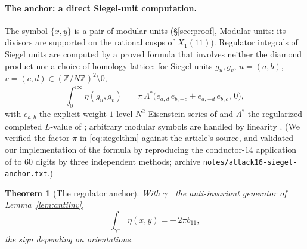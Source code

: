 \documentclass[preprint,12pt]{elsarticle}
\newtheorem{theorem}{Theorem}[section]
\theoremstyle{definition}
\theoremstyle{remark}
\newcommand{\Z}{\mathbb{Z}}
\begin{document}
\paragraph{The anchor: a direct Siegel-unit computation.}
The symbol $\{x,y\}$ is a pair of modular units (\S\ref{sec:proof}, Modular
units: its divisors are supported on the rational cusps of $X_1(11)$).
Regulator integrals of Siegel units are computed by a proved formula that
involves neither the diamond product nor a choice of homology lattice:
for Siegel units $g_u,g_v$, $u=(a,b)$, $v=(c,d)\in(\Z/N\Z)^2\setminus0$,
\begin{equation}\label{eq:siegelthm}
  \int_0^{i\infty}\eta(g_u,g_v)
  \;=\;\pi\,\Lambda^*\bigl(e_{a,d}\,e_{b,-c}+e_{a,-d}\,e_{b,c},\,0\bigr),
\end{equation}
with $e_{a,b}$ the explicit weight-$1$ level-$N^2$ Eisenstein series of
\cite[Thm.~1, eq.~(2)]{BrunaultSiegel} and $\Lambda^*$ the regularized
completed $L$-value of \cite[\S2]{BrunaultSiegel}; arbitrary modular
symbols are handled by linearity \cite[Rem.~2]{BrunaultSiegel}.  (We
verified the factor $\pi$ in \eqref{eq:siegelthm} against the article's
source, and validated our implementation of the formula by reproducing the
conductor-$14$ application of \cite[\S5.1]{BrunaultSiegel} to $60$ digits
by three independent methods; archive
\texttt{notes/attack16-siegel-anchor.txt}.)

\begin{theorem}[The regulator anchor]\label{thm:anchor}
With $\gamma^-$ the anti-invariant generator of Lemma~\ref{lem:antiinv},
\begin{equation}\label{eq:anchor}
  \int_{\gamma^-}\eta(x,y)=\pm\,2\pi b_{11},
\end{equation}
the sign depending on orientations.
\end{theorem}
\end{document}
